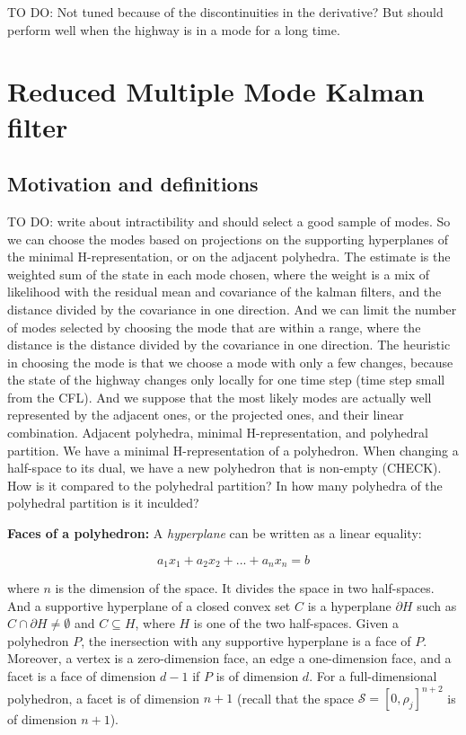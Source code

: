 \documentclass[11pt]{article}
\numberwithin{equation}{section}
\numberwithin{figure}{section}
\numberwithin{table}{section}
\begin{document}
TO DO: Not tuned because of the discontinuities in the derivative? But should perform well when the highway is in a mode for a long time.


\section{Reduced Multiple Mode Kalman filter}

\subsection{Motivation and definitions}

TO DO: write about intractibility and should select a good sample of modes. So we can choose the modes based on projections on the supporting hyperplanes of the minimal H-representation, or on the adjacent polyhedra. The estimate is the weighted sum of the state in each mode chosen, where the weight is a mix of likelihood with the residual mean and covariance of the kalman filters, and the distance divided by the covariance in one direction. And we can limit the number of modes selected by choosing the mode that are within a range, where the distance is the distance divided by the covariance in one direction. The heuristic in choosing the mode is that we choose a mode with only a few changes, because the state of the highway changes only locally for one time step (time step small from the CFL). And we suppose that the most likely modes are actually well represented by the adjacent ones, or the projected ones, and their linear combination. Adjacent polyhedra, minimal H-representation, and polyhedral partition. We have a minimal H-representation of a polyhedron. When changing a half-space to its dual, we have a new polyhedron that is non-empty (CHECK). How is it compared to the polyhedral partition? In how many polyhedra of the polyhedral partition is it inculded?

\hspace{10mm}

\noindent \textbf{Faces of a polyhedron: }A \textit{hyperplane} can be written as a linear equality:

\begin{equation}
a_{1}x_{1} + a_{2}x_{2} + ... + a_{n}x_{n} = b
\label{eq:hyperplane}
\end{equation}

\noindent where $n$ is the dimension of the space. It divides the space in two half-spaces. And a supportive hyperplane of a closed convex set $C$ is a hyperplane $\partial H$ such as $C\cap\partial H\neq \emptyset$ and $C\subseteq H$, where $H$ is one  of the two half-spaces. Given a polyhedron $P$, the inersection with any supportive hyperplane is a face of $P$. Moreover, a vertex is a zero-dimension face, an edge a one-dimension face, and a facet is a face of dimension $d-1$ if $P$ is of dimension $d$. For a full-dimensional polyhedron, a facet is of dimension $n+1$ (recall that the space $\mathcal{S} = [0,\rho_{j}]^{n+2}$ is of dimension $n+1$).
\end{document}

